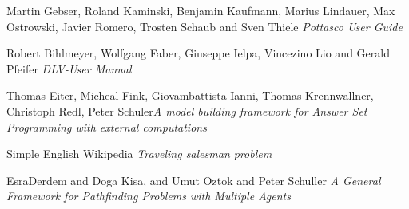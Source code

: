 \documentclass[a4paper, titlepage]{article}
\begin{document}
\begin{thebibliography}{1}
Martin Gebser, Roland Kaminski, Benjamin 
Kaufmann, Marius Lindauer, Max Ostrowski, Javier Romero, 
Trosten Schaub and Sven Thiele {\em Pottasco User Guide}

Robert Bihlmeyer, Wolfgang Faber, Giuseppe 
Ielpa, Vincezino Lio and Gerald Pfeifer {\em DLV-User 
Manual} 

Thomas Eiter, Micheal Fink, Giovambattista 
Ianni, Thomas Krennwallner, Christoph Redl, Peter 
Schuler{\em A model building framework for Answer Set 
Programming with external computations} 

 Simple English Wikipedia {\em Traveling 
salesman problem}

 EsraDerdem and Doga Kisa, and Umut 
Oztok and Peter Schuller {\em A General Framework for  
Pathfinding Problems with Multiple Agents}
\end{thebibliography} 
\end{document}
